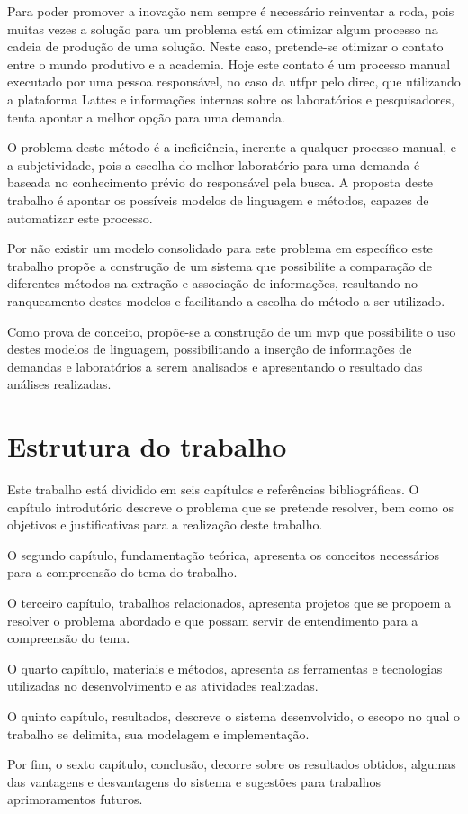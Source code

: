 Para poder promover a inovação nem sempre é necessário reinventar a roda, pois muitas vezes a solução para um problema está em otimizar algum processo na cadeia de produção de uma solução. Neste caso, pretende-se otimizar o contato entre o mundo produtivo e a academia. Hoje este contato é um processo manual executado por uma pessoa responsável, no caso da \gls{utfpr} pelo \gls{direc}, que utilizando a plataforma Lattes e informações internas sobre os laboratórios e pesquisadores, tenta apontar a melhor opção para uma demanda.

O problema deste método é a ineficiência, inerente a qualquer processo manual, e a subjetividade, pois a escolha do melhor laboratório para uma demanda é baseada no conhecimento prévio do responsável pela busca. A proposta deste trabalho é apontar os possíveis modelos de linguagem e métodos, capazes de automatizar este processo.

Por não existir um modelo consolidado para este problema em específico este trabalho propõe a construção de um sistema que possibilite a comparação de diferentes métodos na extração e associação de informações, resultando no ranqueamento destes modelos e facilitando a escolha do método a ser utilizado.

Como prova de conceito, propõe-se a construção de um \gls{mvp} que possibilite o uso destes modelos de linguagem, possibilitando a inserção de informações de demandas e laboratórios a serem analisados e apresentando o resultado das análises realizadas.

\section{Estrutura do trabalho}\label{sec:estruturaTrabalho}

Este trabalho está dividido em seis capítulos e referências bibliográficas. O capítulo introdutório descreve o problema que se pretende resolver, bem como os objetivos e justificativas para a realização deste trabalho. 

O segundo capítulo, fundamentação teórica, apresenta os conceitos necessários para a compreensão do tema do trabalho.

O terceiro capítulo, trabalhos relacionados, apresenta projetos que se propoem a resolver o problema abordado e que possam servir de entendimento para a compreensão do tema.

O quarto capítulo, materiais e métodos, apresenta as ferramentas e tecnologias utilizadas no desenvolvimento e as atividades realizadas.

O quinto capítulo, resultados, descreve o sistema desenvolvido, o escopo no qual o trabalho se delimita, sua modelagem e implementação.

Por fim, o sexto capítulo, conclusão, decorre sobre os resultados obtidos, algumas das vantagens e desvantagens do sistema e sugestões para trabalhos aprimoramentos futuros.